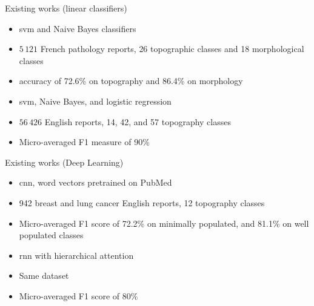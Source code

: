 \begin{frame}{Existing works (linear classifiers)}
  \begin{block}{\footnotesize{}}
    \begin{itemize}
      \footnotesize
    \item \acs{svm} and Naive Bayes classifiers
    \item \alert{$5\,121$} French pathology reports, \alert{26}
      topographic classes and \alert{18} morphological classes 
    \item accuracy of \alert{72.6\%} on topography and \alert{86.4\%} on morphology
    \end{itemize}
  \end{block}
  \begin{block}{\footnotesize{}}
    \begin{itemize}
      \footnotesize
    \item \acs{svm}, Naive Bayes, and logistic regression
    \item \alert{$56\,426$} English reports, \alert{14}, \alert{42}, and \alert{57} topography classes
    \item Micro-averaged F1 measure of \alert{90\%}
    \end{itemize}
  \end{block}
\end{frame}

\begin{frame}{Existing works (Deep Learning)}
  \begin{block}{\footnotesize{}}
    \begin{itemize}
      \footnotesize
    \item \alert{\acs{cnn}}, \alert{word vectors} pretrained on 
      PubMed
    \item \alert{942} breast and lung cancer English
      reports, \alert{12} topography classes
    \item Micro-averaged F1 score of \alert{72.2\%} on minimally
      populated, and \alert{81.1\%} on well populated classes
    \end{itemize}
  \end{block}
  \begin{block}{\footnotesize{}}
    \begin{itemize}
      \footnotesize
    \item \alert{\acs{rnn}} with hierarchical attention
    \item \alert{Same} dataset
    \item Micro-averaged F1 score of \alert{80\%}
    \end{itemize}
  \end{block}
\end{frame}


